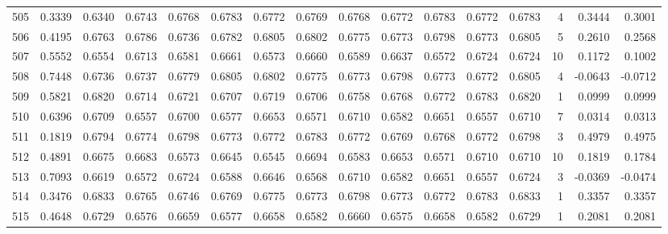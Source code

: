 \begin{tabular}{lrrrrrrrrrrrrrrr}
505 &      0.3339 &  0.6340 &  0.6743 &  0.6768 &  0.6783 &  0.6772 &  0.6769 &  0.6768 &  0.6772 &  0.6783 &   0.6772 &     0.6783 &      4 &                    0.3444 &                     0.3001 \\
506 &      0.4195 &  0.6763 &  0.6786 &  0.6736 &  0.6782 &  0.6805 &  0.6802 &  0.6775 &  0.6773 &  0.6798 &   0.6773 &     0.6805 &      5 &                    0.2610 &                     0.2568 \\
507 &      0.5552 &  0.6554 &  0.6713 &  0.6581 &  0.6661 &  0.6573 &  0.6660 &  0.6589 &  0.6637 &  0.6572 &   0.6724 &     0.6724 &     10 &                    0.1172 &                     0.1002 \\
508 &      0.7448 &  0.6736 &  0.6737 &  0.6779 &  0.6805 &  0.6802 &  0.6775 &  0.6773 &  0.6798 &  0.6773 &   0.6772 &     0.6805 &      4 &                   -0.0643 &                    -0.0712 \\
509 &      0.5821 &  0.6820 &  0.6714 &  0.6721 &  0.6707 &  0.6719 &  0.6706 &  0.6758 &  0.6768 &  0.6772 &   0.6783 &     0.6820 &      1 &                    0.0999 &                     0.0999 \\
510 &      0.6396 &  0.6709 &  0.6557 &  0.6700 &  0.6577 &  0.6653 &  0.6571 &  0.6710 &  0.6582 &  0.6651 &   0.6557 &     0.6710 &      7 &                    0.0314 &                     0.0313 \\
511 &      0.1819 &  0.6794 &  0.6774 &  0.6798 &  0.6773 &  0.6772 &  0.6783 &  0.6772 &  0.6769 &  0.6768 &   0.6772 &     0.6798 &      3 &                    0.4979 &                     0.4975 \\
512 &      0.4891 &  0.6675 &  0.6683 &  0.6573 &  0.6645 &  0.6545 &  0.6694 &  0.6583 &  0.6653 &  0.6571 &   0.6710 &     0.6710 &     10 &                    0.1819 &                     0.1784 \\
513 &      0.7093 &  0.6619 &  0.6572 &  0.6724 &  0.6588 &  0.6646 &  0.6568 &  0.6710 &  0.6582 &  0.6651 &   0.6557 &     0.6724 &      3 &                   -0.0369 &                    -0.0474 \\
514 &      0.3476 &  0.6833 &  0.6765 &  0.6746 &  0.6769 &  0.6775 &  0.6773 &  0.6798 &  0.6773 &  0.6772 &   0.6783 &     0.6833 &      1 &                    0.3357 &                     0.3357 \\
515 &      0.4648 &  0.6729 &  0.6576 &  0.6659 &  0.6577 &  0.6658 &  0.6582 &  0.6660 &  0.6575 &  0.6658 &   0.6582 &     0.6729 &      1 &                    0.2081 &                     0.2081 \\

\end{tabular}
